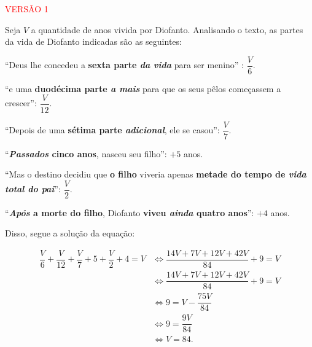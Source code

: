 
\textcolor{red}{ VERSÃO 1 } %

Seja $V$ a quantidade de anos vivida por Diofanto. Analisando o texto, as
partes da vida de Diofanto indicadas são as seguintes:

``Deus lhe concedeu a \textbf{sexta parte \emph{da vida}} para ser menino'' : $\dfrac{V}{6}$.

``e uma \textbf{duodécima parte \emph{a mais}} para que os seus pêlos começassem a crescer'': $\dfrac{V}{12}$.

``Depois de uma \textbf{sétima parte \emph{adicional}}, ele se casou'': $\dfrac{V}{7}$.

``\textbf{\emph{Passados} cinco anos}, nasceu seu filho'': $+5$ anos.

``Mas o destino decidiu que \textbf{o filho} viveria apenas \textbf{metade do tempo de \emph{vida total do pai}}'': $\dfrac{V}{2}$.

``\textbf{\emph{Após} a morte do filho}, Diofanto \textbf{viveu \emph{ainda} quatro anos}'': $+4$ anos.


Disso, segue a solução da equação:

\begin{align*}
    \dfrac{V}{6} + \dfrac{V}{12} + \dfrac{V}{7} + 5 + \dfrac{V}{2} + 4 = V & \iff \dfrac{14V+7V+12V+42V}{84} + 9 = V \\
                                                                           & \iff \dfrac{14V+7V+12V+42V}{84} + 9 = V \\
                                                                           & \iff 9 = V - \dfrac{75V}{84}            \\
                                                                           & \iff 9 = \dfrac{9V}{84}                 \\
                                                                           & \iff V = 84.
\end{align*}


